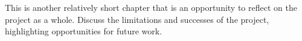 This is another relatively short chapter that is an opportunity to reflect on the project as a whole. Discuss the limitations and successes of the project, highlighting opportunities for future work. 